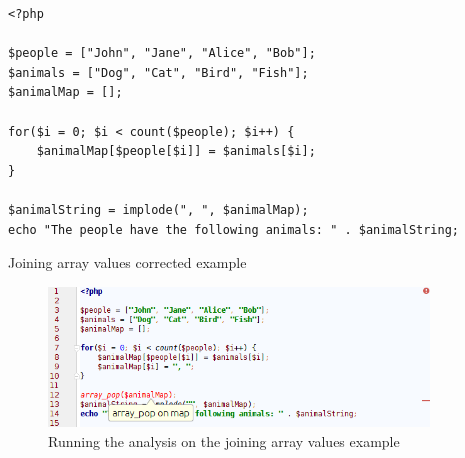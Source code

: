 \begin{program}
\begin{lstlisting}
<?php

$people = ["John", "Jane", "Alice", "Bob"];
$animals = ["Dog", "Cat", "Bird", "Fish"];
$animalMap = [];

for($i = 0; $i < count($people); $i++) {
    $animalMap[$people[$i]] = $animals[$i];
}

$animalString = implode(", ", $animalMap);
echo "The people have the following animals: " . $animalString;
\end{lstlisting}
\caption{Joining array values corrected example}
\label{lst:arrayPopExampleFixed}
\end{program}

\begin{figure}
\centering
\includegraphics[width=0.9\textwidth]{chapters/caseStudy/screens/pop}
\caption{Running the analysis on the joining array values example}
\label{fig:arrayPopScreenshot}
\end{figure}





